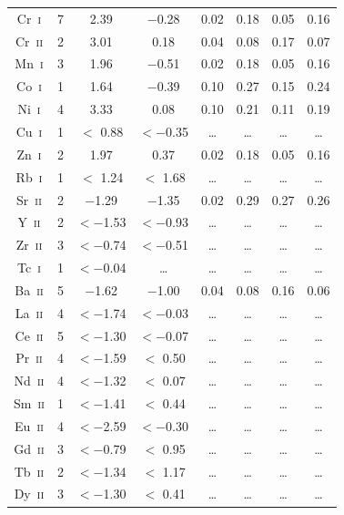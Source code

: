 \documentclass[useAMS,usenatbib,usegraphicx]{mn2e}
\begin{document}
\begin{table}
\begin{minipage}{\textwidth}
\begin{tabular}{cccccccc}
 Cr~\textsc{i}  &   7 &     2.39 & $-$0.28 &  0.02 &  0.18 &  0.05 &  0.16  \\
 Cr~\textsc{ii} &   2 &     3.01 &    0.18 &  0.04 &  0.08 &  0.17 &  0.07  \\
 Mn~\textsc{i}  &   3 &     1.96 & $-$0.51 &  0.02 &  0.18 &  0.05 &  0.16  \\
 Co~\textsc{i}  &   1 &     1.64 & $-$0.39 &  0.10 &  0.27 &  0.15 &  0.24  \\
 Ni~\textsc{i}  &   4 &     3.33 &    0.08 &  0.10 &  0.21 &  0.11 &  0.19  \\
 Cu~\textsc{i}  &   1 & $<$ 0.88 &$<-$0.35 & \ldots& \ldots& \ldots& \ldots \\
 Zn~\textsc{i}  &   2 &     1.97 &    0.37 &  0.02 &  0.18 &  0.05 &  0.16  \\
 Rb~\textsc{i}  &   1 & $<$ 1.24 &$<$ 1.68 & \ldots& \ldots& \ldots& \ldots \\
 Sr~\textsc{ii} &   2 &  $-$1.29 & $-$1.35 &  0.02 &  0.29 &  0.27 &  0.26  \\
 Y~\textsc{ii}  &   2 & $<-$1.53 &$<-$0.93 & \ldots& \ldots& \ldots& \ldots \\
 Zr~\textsc{ii} &   3 & $<-$0.74 &$<-$0.51 & \ldots& \ldots& \ldots& \ldots \\
 Tc~\textsc{i}  &   1 & $<-$0.04 & \ldots  & \ldots& \ldots& \ldots& \ldots \\
 Ba~\textsc{ii} &   5 &  $-$1.62 & $-$1.00 &  0.04 &  0.08 &  0.16 &  0.06  \\
 La~\textsc{ii} &   4 & $<-$1.74 &$<-$0.03 & \ldots& \ldots& \ldots& \ldots \\
 Ce~\textsc{ii} &   5 & $<-$1.30 &$<-$0.07 & \ldots& \ldots& \ldots& \ldots \\
 Pr~\textsc{ii} &   4 & $<-$1.59 &$<$ 0.50 & \ldots& \ldots& \ldots& \ldots \\
 Nd~\textsc{ii} &   4 & $<-$1.32 &$<$ 0.07 & \ldots& \ldots& \ldots& \ldots \\
 Sm~\textsc{ii} &   1 & $<-$1.41 &$<$ 0.44 & \ldots& \ldots& \ldots& \ldots \\
 Eu~\textsc{ii} &   4 & $<-$2.59 &$<-$0.30 & \ldots& \ldots& \ldots& \ldots \\
 Gd~\textsc{ii} &   3 & $<-$0.79 &$<$ 0.95 & \ldots& \ldots& \ldots& \ldots \\
 Tb~\textsc{ii} &   2 & $<-$1.34 &$<$ 1.17 & \ldots& \ldots& \ldots& \ldots \\
 Dy~\textsc{ii} &   3 & $<-$1.30 &$<$ 0.41 & \ldots& \ldots& \ldots& \ldots \\

\end{tabular}
\end{minipage}
\end{table}
\end{document}
